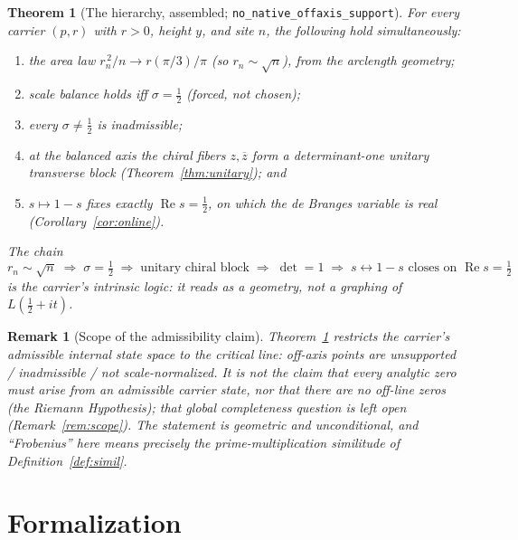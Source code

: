 \documentclass[11pt]{article}
\newtheorem{theorem}[definition]{Theorem}
\newtheorem{remark}[definition]{Remark}
\DeclareMathOperator{\Ree}{Re}
\newcommand{\conj}[1]{\overline{#1}}
\newcommand{\code}[1]{\texttt{#1}}
\begin{document}
\begin{theorem}[The hierarchy, assembled; \code{no\_native\_offaxis\_support}]\label{thm:hierarchy}
For every carrier $(p,r)$ with $r>0$, height $y$, and site $n$, the following hold simultaneously:
\begin{enumerate}[label=\textup{(\arabic*)}]
\item the area law $r_n^{\,2}/n\to r(\pi/3)/\pi$ (so $r_n\sim\sqrt n$), from the arclength geometry;
\item scale balance holds iff $\sigma=\tfrac12$ (forced, not chosen);
\item every $\sigma\neq\tfrac12$ is inadmissible;
\item at the balanced axis the chiral fibers $z,\conj z$ form a determinant-one \emph{unitary}
transverse block (Theorem~\ref{thm:unitary}); and
\item $s\mapsto1-s$ fixes exactly $\Ree s=\tfrac12$, on which the de Branges variable is real
(Corollary~\ref{cor:online}).
\end{enumerate}
The chain
\[
  r_n\sim\sqrt n \;\Longrightarrow\; \sigma=\tfrac12 \;\Longrightarrow\;
  \text{unitary chiral block} \;\Longrightarrow\; \det=1 \;\Longrightarrow\;
  s\leftrightarrow1-s \text{ closes on } \Ree s=\tfrac12
\]
is the carrier's intrinsic logic: it reads as a geometry, not a graphing of $L(\tfrac12+it)$.
\end{theorem}

\begin{remark}[Scope of the admissibility claim]\label{rem:admissiblescope}
Theorem~\ref{thm:hierarchy} restricts the carrier's admissible \emph{internal} state space to the
critical line: off-axis points are unsupported / inadmissible / not scale-normalized. It is \emph{not}
the claim that every analytic zero must arise from an admissible carrier state, nor that there are no
off-line zeros (the Riemann Hypothesis); that global completeness question is left open
(Remark~\ref{rem:scope}). The statement is geometric and unconditional, and ``Frobenius'' here means
precisely the prime-multiplication similitude of Definition~\ref{def:simil}.
\end{remark}

\section{Formalization}\label{sec:formal}
\end{document}
